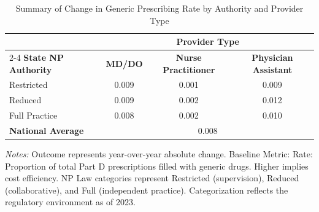 \begin{table}[htbp]
    \centering
    \caption{Summary of Change in Generic Prescribing Rate by Authority and Provider Type}
    \label{tab:d_partd_generic_rate_provtype}
    \vspace{0.2cm}
    \begin{tabular}{lccc}
        \toprule
        & \multicolumn{3}{c}{\textbf{Provider Type}} \\
        \cmidrule(lr){2-4}
        \textbf{State NP Authority} & \textbf{MD/DO} & \textbf{Nurse Practitioner} & \textbf{Physician Assistant} \\
        \midrule
        Restricted & 0.009 & 0.001 & 0.009 \\
        Reduced & 0.009 & 0.002 & 0.012 \\
        Full Practice & 0.008 & 0.002 & 0.010 \\
        \midrule
        \textbf{National Average} & \multicolumn{3}{c}{0.008} \\
        \bottomrule
    \end{tabular}
    \vspace{0.1cm}
    \begin{minipage}{0.85\textwidth}
        \footnotesize \textit{Notes:} Outcome represents year-over-year absolute change. Baseline Metric: Rate: Proportion of total Part D prescriptions filled with generic drugs. Higher implies cost efficiency. NP Law categories represent Restricted (supervision), Reduced (collaborative), and Full (independent practice). Categorization reflects the regulatory environment as of 2023.
    \end{minipage}
\end{table}